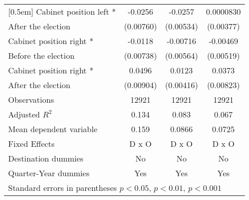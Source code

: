 \begin{table}[!ht]
\begin{tabular}{l*{3}{c}}
[0.5em]
Cabinet position left * &     -0.0256\sym{**} &     -0.0257\sym{***}&   0.0000830         \\
 After the election                   &   (0.00760)         &   (0.00534)         &   (0.00377)         \\
[0.5em]
Cabinet position right * &     -0.0118         &    -0.00716         &    -0.00469         \\
 Before the election                   &   (0.00738)         &   (0.00564)         &   (0.00519)         \\
[0.5em]
Cabinet position right * &      0.0496\sym{***}&      0.0123\sym{**} &      0.0373\sym{***}\\
After the election                    &   (0.00904)         &   (0.00416)         &   (0.00823)         \\
\hline
Observations        &       12921         &       12921         &       12921         \\
Adjusted \(R^{2}\)  &       0.134         &       0.083         &       0.067         \\
Mean dependent variable&       0.159         &      0.0866         &      0.0725         \\
Fixed Effects       &       D x O         &       D x O         &       D x O         \\
Destination dummies &          No         &          No         &          No         \\
Quarter-Year dummies&         Yes         &         Yes         &         Yes         \\
\hline\hline
\multicolumn{4}{l}{Standard errors in parentheses \sym{*} \(p<0.05\), \sym{**} \(p<0.01\), \sym{***} \(p<0.001\)}\\
\end{tabular}
\label{dec_table1_baseline}
\end{table}
